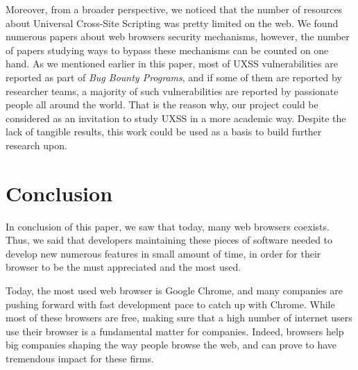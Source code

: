 \documentclass[journal]{IEEEtran}
\begin{document}
\medskip

Moreover, from a broader perspective, we noticed that the number of resources about Universal Cross-Site Scripting was pretty limited on the web. We found numerous papers about web browsers security mechanisms, however, the number of papers studying ways to bypass these mechanisms can be counted on one hand. As we mentioned earlier in this paper, most of UXSS vulnerabilities are reported as part of \emph{Bug Bounty Programs}, and if some of them are reported by researcher teams, a majority of such vulnerabilities are reported by passionate people all around the world. That is the reason why, our project could be considered as an invitation to study UXSS in a more academic way. Despite the lack of tangible results, this work could be used as a basis to build further research upon.


\section{Conclusion}

In conclusion of this paper, we saw that today, many web browsers coexists. Thus, we said that developers maintaining these pieces of software needed to develop new numerous features in small amount of time, in order for their browser to be the must appreciated and the most used. 

\medskip

Today, the most used web browser is Google Chrome, and many companies are pushing forward with fast development pace to catch up with Chrome. While most of these browsers are free, making sure that a high number of internet users use their browser is a fundamental matter for companies. Indeed, browsers help big companies shaping the way people browse the web, and can prove to have tremendous impact for these firms.

\medskip
\end{document}
